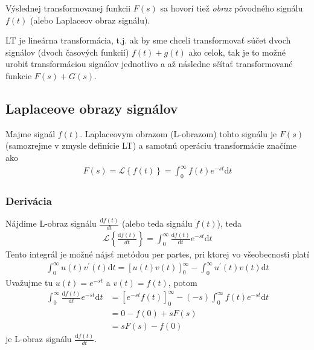 \documentclass[a4paper, 10pt, ]{article}
\begin{document}
Výslednej transformovanej funkcii $F(s)$ sa hovorí tiež \emph{obraz} pôvodného signálu $f(t)$ (alebo Laplaceov obraz signálu).

LT je lineárna transformácia, t.j. ak by sme chceli transformovať súčet dvoch signálov (dvoch časových funkcií) $f(t) + g(t)$ ako celok, tak je to možné urobiť transformáciou signálov jednotlivo a až následne sčítať transformované funkcie $F(s) + G(s)$.



\subsection{Laplaceove obrazy signálov}

Majme signál $f(t)$. Laplaceovym obrazom (L-obrazom) tohto signálu je $F(s)$ (samozrejme v zmysle definície LT) a samotnú operáciu transformácie značíme ako
\begin{align}
    F(s)  =  \mathcal L \left\{ f(t) \right\} = \int_0^\infty f(t) e^{-st}\text{d}t
\end{align}


\subsubsection{Derivácia}


Nájdime L-obraz signálu $\frac{\text{d}f(t)}{dt}$ (alebo teda signálu $\dot f(t)$), teda
\begin{align}
    \mathcal L \left\{ \frac{\text{d}f(t)}{dt} \right\} = \int_0^\infty \frac{\text{d}f(t)}{\text{d}t} e^{-st}\text{d}t
\end{align}
Tento integrál je možné nájsť metódou per partes, pri ktorej vo všeobecnosti platí
\begin{align}
    \int_0^\infty u(t)v^\prime(t)\text{d}t = \left[ u(t)v(t) \right]_0^\infty - \int_0^\infty u^\prime(t) v(t) \text{d}t
\end{align}
Uvažujme tu $u(t) = e^{-st}$ a $v(t) = f(t)$, potom
\begin{equation}
    \begin{aligned}
        \int_0^\infty \frac{\text{d}f(t)}{\text{d}t} e^{-st}\text{d}t
            &=  \left[ e^{-st} f(t) \right]_0^\infty - (-s)  \int_0^\infty f(t) e^{-st}\text{d}t \\
            &= 0 - f(0) + s F(s) \\
            &= s F(s) - f(0)
    \end{aligned}
\end{equation}
je L-obraz signálu $\frac{\text{d}f(t)}{dt}$.
\end{document}
